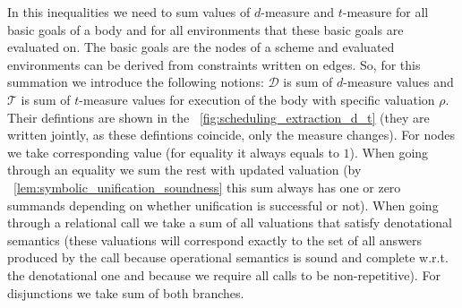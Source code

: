 In this inequalities we need to sum values of $d$-measure and $t$-measure for all basic goals of a body and for all environments that these basic goals are evaluated on. The basic goals are the nodes of a scheme and evaluated environments can be derived from constraints written on edges. So, for this summation we introduce the following notions: $\mathcal{D}$ is sum of $d$-measure values and $\mathcal{T}$ is sum of $t$-measure values for execution of the body with specific valuation $\rho$. Their defintions are shown in the \figureword~\ref{fig:scheduling_extraction_d_t} (they are written jointly, as these defintions coincide, only the measure changes). For nodes we take corresponding value (for equality it always equals to $1$). When going through an equality we sum the rest with updated valuation (by \lemmaword~\ref{lem:symbolic_unification_soundness} this sum always has one or zero summands depending on whether unification is successful or not). When going through a relational call we take a sum of all valuations that satisfy denotational semantics (these valuations will correspond exactly to the set of all answers produced by the call because operational semantics is sound and complete w.r.t. the denotational one and because we require all calls to be non-repetitive). For disjunctions we take sum of both branches.


